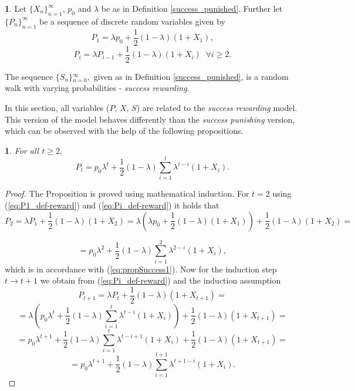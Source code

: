 \documentclass{amsart}
\theoremstyle{definition}
\newtheorem{defn}[thm]{\protect\definitionname}
\theoremstyle{plain}
\newtheorem{prop}[thm]{\protect\propositionname}
\theoremstyle{plain}
\theoremstyle{plain}
\numberwithin{equation}{section}
\providecommand{\definitionname}{Definition}
\providecommand{\propositionname}{Proposition}
\begin{document}
    \begin{defn}
        \label{succes_rewarded}Let ${\{X_{n}\}}_{n=1}^{\infty}$, $p_{0}$
        and $\lambda$ be as in Definition \ref{success_punished}. Further
        let ${\{P_{n}\}}_{n=1}^{\infty}$ be a sequence of discrete random
        variables given by
        \begin{equation}
            P_{1}=\lambda p_{0}+\frac{1}{2}(1-\lambda)(1+X_{1}),\label{eq:P1_def-reward}
        \end{equation}
        \begin{equation}
            P_{i}=\lambda P_{i-1}+\frac{1}{2}(1-\lambda)(1+X_{i})\;\;\forall i\geq2.\label{eq:Pi_def-reward}
        \end{equation}

        The sequence ${\{S_{n}\}}{}_{n=0}^{\infty},$ given as in Definition \ref{success_punished}, is a random walk with varying probabilities - \emph{success
        rewarding}.
    \end{defn}
    In this section, all variables ($P,\,X,\,S$) are related to the
    \emph{success rewarding} model. This version of the model behaves differently
    than the \emph{success punishing} version, which can be observed with
    the help of the following propositions.

    \begin{prop}
        For all $t\ge 2,$
        \begin{equation}
            P_{t}=p_{0}\lambda^{t}+\frac{1}{2}(1-\lambda)\sum_{i=1}^{t}\lambda^{t-i}(1+X_{i}).\label{eq:propSuccess1}
        \end{equation}
    \end{prop}

    \begin{proof}
        The Proposition is proved using mathematical induction. For $t=2$ using (\ref{eq:P1_def-reward})
        and (\ref{eq:Pi_def-reward}) it holds that
        \[
            P_{2}=\lambda P_{1}+\frac{1}{2}(1-\lambda)(1+X_{2})=\lambda(\lambda p_{0}+\frac{1}{2}(1-\lambda)(1+X_{1}))+\frac{1}{2}(1-\lambda)(1+X_{2})=
        \]

        \[
            =p_{0}\lambda^{2}+\frac{1}{2}(1-\lambda)\sum_{i=1}^{2}\lambda^{2-i}(1+X_{i}),
        \]
        which is in accordance with (\ref{eq:propSuccess1}). Now for the
        induction step $t\rightarrow t+1$ we obtain from (\ref{eq:Pi_def-reward})
        and the induction assumption
        \[
            P_{t+1}=\lambda P_{t}+\frac{1}{2}(1-\lambda)(1+X_{t+1})=
        \]
        \[
            =\lambda(p_{0}\lambda^{t}+\frac{1}{2}(1-\lambda)\sum_{i=1}^{t}\lambda^{t-i}(1+X_{i}))+\frac{1}{2}(1-\lambda)(1+X_{t+1})=
        \]
        \[
            =p_{0}\lambda^{t+1}+\frac{1}{2}(1-\lambda)\sum_{i=1}^{t}\lambda^{t-i+1}(1+X_{i})+\frac{1}{2}(1-\lambda)(1+X_{t+1})=
        \]
        \[
            =p_{0}\lambda^{t+1}+\frac{1}{2}(1-\lambda)\sum_{i=1}^{t+1}\lambda^{t+1-i}(1+X_{i}).
        \]
    \end{proof}
\end{document}
